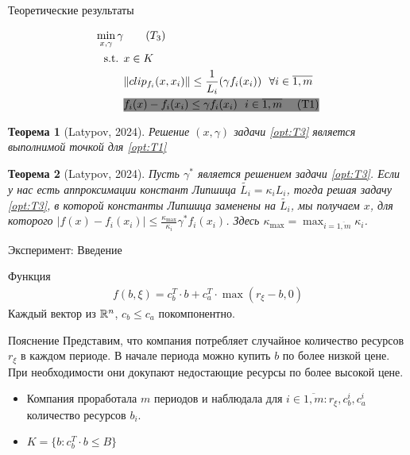 \documentclass{beamer}
\newcommand\marker[2]{{\fboxsep=0pt\colorbox{#1}{\strut #2}}}
\newcommand{\tvi}{f_i(x_i)}
\begin{document}
\begin{frame}{Теоретические результаты}
\newtheorem{theorem}{Теорема}
    \begin{align*}
    \min_{x, \gamma} \gamma & \tag{$T_3$}\label{opt:T3} \\
    \text{s.t. } &x \in K \\
                 &\|clip_{f_i}(x,x_i)\| \leq \frac{1}{L_i}(\gamma f_i(x_i)) ~~ \forall i\in\overline{1,m} \\
                &\marker{gray}{$f_i(x) - \tvi \leq  \gamma \tvi ~~  i\in\overline{1, m}$ ~~~\text{(T1)}}
    \end{align*}
    
\begin{theorem}[Latypov, 2024]
    Решение $(x, \gamma)$ задачи \ref{opt:T3} является выполнимой точкой для  \ref{opt:T1}
\end{theorem}

\newcommand{\sto}{\gamma^*} %
\newcommand{\stt}{\wt{\gamma}} %
\newcommand{\stf}{\overline{\gamma}} %
\newcommand{\km}{\kappa{\max}}
\begin{theorem}[Latypov, 2024]
Пусть $\sto$ является решением задачи \ref{opt:T3}. Если у нас есть аппроксимации констант Липшица $\widetilde{L_i} = \kappa_i L_i$, тогда решая задачу \ref{opt:T3}, в которой константы Липшица заменены на $\widetilde{L_i}$, мы получаем $x$, для которого $|f(x) - \tvi| \leq \frac{\kappa_{\max}}{\kappa_i} \sto \tvi$. Здесь $\kappa_{\max} = \max_{i = \overline{1,m}} \kappa_i$.
\end{theorem}
\end{frame}
\begin{frame}{Эксперимент: Введение}
\begin{block}{Функция}
    \begin{align*}
        f(b, \xi) = c_b^T \cdot b + c_a^T \cdot \max(r_{\xi} - b, 0)
    \end{align*}
    Каждый вектор из ${\mathbb R}^n$, $c_b \le c_a$ покомпонентно.
\end{block}

\begin{block}{Пояснение}
    Представим, что компания потребляет случайное количество ресурсов $r_{\xi}$ в каждом периоде. 
В начале периода можно купить $b$ по более низкой цене. 
При необходимости они докупают недостающие ресурсы по более высокой цене.
\end{block}
    \begin{itemize}
        \item Компания проработала $m$ периодов и наблюдала для $i \in \overline{1, m}: r_\xi, c_b^i, c_a^i$ количество ресурсов $b_i$. 
        \item $K = \{b: c_b^T \cdot b \leq B \}$
    \end{itemize}
\end{frame}
\end{document}
